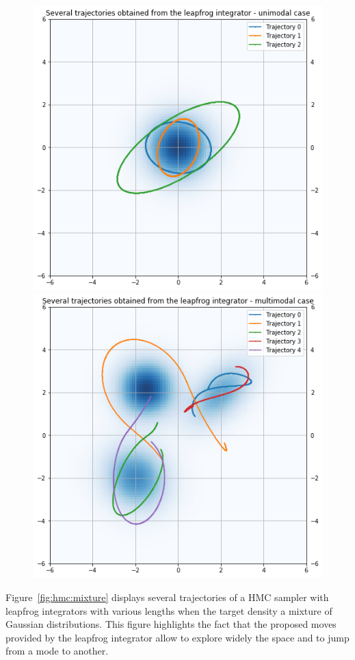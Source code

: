 \documentclass[english,graybox,envcountchap,envcountsame,sectrefs,shortlabels]{svmono}
\theoremstyle{style}
\begin{document}
\begin{figure} 
\label{fig:leapfrog}
\centering
\includegraphics[scale=0.4]{leapfrog}
\includegraphics[scale=0.4]{leapfrog_mixture}
\end{figure}

Figure~\ref{fig:hmc:mixture} displays several trajectories of a HMC sampler with leapfrog integrators with various lengths when the target density a mixture of Gaussian distributions. This figure highlights the fact that the proposed moves provided by the leapfrog integrator allow to explore widely the space and to jump from a mode to another.
\end{document}
